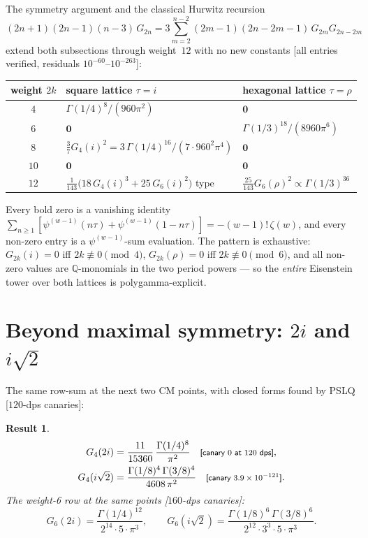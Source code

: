 \documentclass[11pt]{article}
\newtheorem{result}{Result}[section]
\theoremstyle{remark}
\newcommand{\dps}[1]{\textsf{\footnotesize[#1]}}
\begin{document}
The symmetry argument and the classical Hurwitz recursion \cite{Hurwitz}
\[
(2n+1)(2n-1)(n-3)\,G_{2n}=3\sum_{m=2}^{n-2}(2m-1)(2n-2m-1)\,G_{2m}G_{2n-2m}
\]
extend both subsections through weight~$12$ with no new constants
\dps{all entries verified, residuals $10^{-60}$--$10^{-263}$}:

\begin{center}
\begin{tabular}{c l l}
\toprule
weight $2k$ & square lattice $\tau=i$ & hexagonal lattice $\tau=\rho$\\
\midrule
$4$ & $\Gamma(1/4)^8/(960\pi^2)$ & $\mathbf{0}$\\
$6$ & $\mathbf{0}$ & $\Gamma(1/3)^{18}/(8960\pi^6)$\\
$8$ & $\tfrac37 G_4(i)^2=3\,\Gamma(1/4)^{16}/(7\cdot 960^2\pi^4)$ & $\mathbf{0}$\\
$10$ & $\mathbf{0}$ & $\mathbf{0}$\\
$12$ & $\tfrac{1}{143}\bigl(18\,G_4(i)^3+25\,G_6(i)^2\bigr)$ type
     & $\tfrac{25}{143}G_6(\rho)^2\propto\Gamma(1/3)^{36}$\\
\bottomrule
\end{tabular}
\end{center}

Every bold zero is a vanishing identity
$\sum_{n\ge1}[\psi^{(w-1)}(n\tau)+\psi^{(w-1)}(1-n\tau)]=-(w-1)!\,\zeta(w)$, and every
non-zero entry is a $\psi^{(w-1)}$-sum evaluation. The pattern is exhaustive: $G_{2k}(i)=0$
iff $2k\not\equiv 0\pmod 4$, $G_{2k}(\rho)=0$ iff $2k\not\equiv 0\pmod 6$, and all non-zero
values are $\mathbb{Q}$-monomials in the two period powers --- so the \emph{entire} Eisenstein
tower over both lattices is polygamma-explicit.

\section{Beyond maximal symmetry: \texorpdfstring{$2i$ and $i\sqrt2$}{2i and i sqrt(2)}}
\label{sec:nextpoints}

The same row-sum at the next two CM points, with closed forms found by PSLQ
\dps{$120$-dps canaries}:

\begin{result}\label{res:2i}
\begin{gather*}
G_4(2i)=\frac{11}{15360}\,\frac{\Gamma(1/4)^8}{\pi^2}
\quad\text{\dps{canary $0$ at $120$ dps}},\\
G_4(i\sqrt2)=\frac{\Gamma(1/8)^4\,\Gamma(3/8)^4}{4608\,\pi^2}
\quad\text{\dps{canary $3.9\times10^{-121}$}}.
\end{gather*}
The weight-6 row at the same points \dps{$160$-dps canaries}:
\[
G_6(2i)=\frac{\Gamma(1/4)^{12}}{2^{14}\cdot 5\cdot\pi^3},\qquad
G_6(i\sqrt2)=\frac{\Gamma(1/8)^6\,\Gamma(3/8)^6}{2^{12}\cdot 3^3\cdot 5\cdot\pi^3}.
\]
\end{result}
\end{document}
